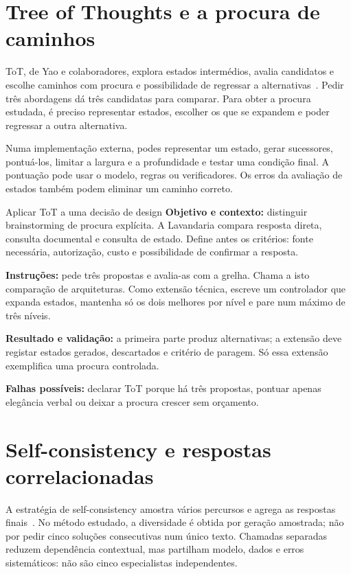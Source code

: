 \section{Tree of Thoughts e a procura de caminhos}
ToT, de Yao e colaboradores, explora estados intermédios, avalia candidatos e escolhe caminhos com procura e possibilidade de regressar a alternativas~\citep{yao2023tot}. Pedir três abordagens dá três candidatas para comparar. Para obter a procura estudada, é preciso representar estados, escolher os que se expandem e poder regressar a outra alternativa.

Numa implementação externa, podes representar um estado, gerar sucessores, pontuá-los, limitar a largura e a profundidade e testar uma condição final. A pontuação pode usar o modelo, regras ou verificadores. Os erros da avaliação de estados também podem eliminar um caminho correto.

\begin{promptlabbox}{Aplicar ToT a uma decisão de design}
\textbf{Objetivo e contexto:} distinguir brainstorming de procura explícita. A Lavandaria compara resposta direta, consulta documental e consulta de estado. Define antes os critérios: fonte necessária, autorização, custo e possibilidade de confirmar a resposta.

\textbf{Instruções:} pede três propostas e avalia-as com a grelha. Chama a isto comparação de arquiteturas. Como extensão técnica, escreve um controlador que expanda estados, mantenha só os dois melhores por nível e pare num máximo de três níveis.

\textbf{Resultado e validação:} a primeira parte produz alternativas; a extensão deve registar estados gerados, descartados e critério de paragem. Só essa extensão exemplifica uma procura controlada.

\textbf{Falhas possíveis:} declarar ToT porque há três propostas, pontuar apenas elegância verbal ou deixar a procura crescer sem orçamento.
\end{promptlabbox}

\section{Self-consistency e respostas correlacionadas}
A estratégia de self-consistency amostra vários percursos e agrega as respostas finais~\citep{wang2023}. No método estudado, a diversidade é obtida por geração amostrada; não por pedir cinco soluções consecutivas num único texto. Chamadas separadas reduzem dependência contextual, mas partilham modelo, dados e erros sistemáticos: não são cinco especialistas independentes.

